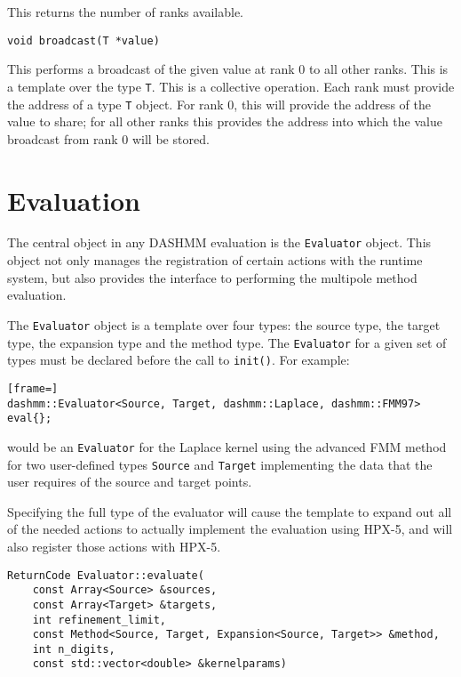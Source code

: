 \noindent This returns the number of ranks available.

\begin{lstlisting}
void broadcast(T *value)
\end{lstlisting}

\noindent This performs a broadcast of the given value at rank 0 to all
other ranks. This is a template over the type \texttt{T}. This is a
collective operation. Each rank must provide the address of a type
\texttt{T} object. For rank 0, this will provide  the address of the value
to share; for all other ranks this provides the address into which the
value broadcast from rank 0 will be stored.

\section{Evaluation}

The central object in any DASHMM evaluation is the \texttt{Evaluator} object.
This object not only manages the registration of certain actions with the
runtime system, but also provides the interface to performing the multipole
method evaluation.

The \texttt{Evaluator} object is a template over four types: the source type,
the target type, the expansion type and the method type. The \texttt{Evaluator}
for a given set of types must be declared before the call to \texttt{init()}.
For example:

\begin{lstlisting}[frame=]
dashmm::Evaluator<Source, Target, dashmm::Laplace, dashmm::FMM97> eval{};
\end{lstlisting}

\noindent would be an \texttt{Evaluator} for the Laplace kernel using the
advanced FMM method for two user-defined types
\texttt{Source} and \texttt{Target} implementing the data that the user
requires of the source and target points.

Specifying the full type of the evaluator will cause the template to expand
out all of the needed actions to actually implement the evaluation using
HPX-5, and will also register those actions with HPX-5.


\begin{lstlisting}
ReturnCode Evaluator::evaluate(
    const Array<Source> &sources,
    const Array<Target> &targets,
    int refinement_limit,
    const Method<Source, Target, Expansion<Source, Target>> &method,
    int n_digits,
    const std::vector<double> &kernelparams)
\end{lstlisting}


